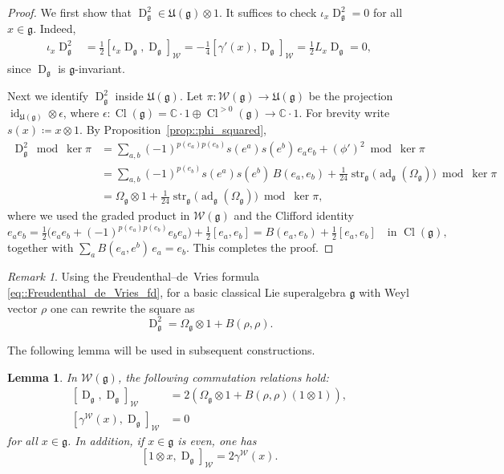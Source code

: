 \documentclass[11pt]{amsart}
\newcommand{\str}{\operatorname{str}}
\newcommand{\id}{\operatorname{id}}
\newcommand{\ad}{\operatorname{ad}}
\newcommand{\Dirac}{\operatorname{D}}
\def\WW{{\mathcal{W}}}
\def\CC{{\mathbb C}}
\def\Cl{{\operatorname{Cl}}}
\def\gg{{\mathfrak{g}}}
\def\UE{{\mathfrak U}}
\theoremstyle{plain}
\newtheorem{lemma}[theorem]{Lemma}
\theoremstyle{remark}
\theoremstyle{definition}
\numberwithin{equation}{section}
\theoremstyle{remark}
\newtheorem{remark}[theorem]{Remark}
\begin{document}
\begin{proof}
We first show that $\Dirac_{\gg}^{2}\in\UE(\gg)\otimes 1$. It suffices to check $\iota_{x}\Dirac_{\gg}^{2}=0$ for all
$x\in\gg$. Indeed,
\[
\begin{split}
\iota_{x}\Dirac_{\gg}^{2}
&=\tfrac12[\iota_{x}\Dirac_{\gg},\Dirac_{\gg}]_{\WW}
=-\tfrac14[\gamma'(x),\Dirac_{\gg}]_{\WW}
=\tfrac12 L_{x}\Dirac_{\gg}=0,
\end{split}
\]
since $\Dirac_{\gg}$ is $\gg$-invariant.

Next we identify $\Dirac_{\gg}^{2}$ inside $\UE(\gg)$. Let $\pi:\WW(\gg)\to\UE(\gg)$ be the projection
$\id_{\UE(\gg)}\otimes\epsilon$, where $\epsilon:\Cl(\gg)=\CC\cdot 1\oplus\Cl^{>0}(\gg)\to\CC\cdot 1$. For brevity write
$s(x)\coloneqq x\otimes 1$. By Proposition~\ref{prop::phi_squared},
\[
\begin{split}
\Dirac_{\gg}^{2}\bmod\ker\pi
&=\sum_{a,b}(-1)^{p(e_{a})p(e_{b})}s(e^{a})s(e^{b})\,e_{a}e_{b}+(\phi')^{2}\bmod\ker\pi\\
&=\sum_{a,b}(-1)^{p(e_{b})}s(e^{a})s(e^{b})\,B(e_{a},e_{b})
+\tfrac{1}{24}\str_{\gg}\!\bigl(\ad_{\gg}(\Omega_{\gg})\bigr)\bmod\ker\pi\\
&=\Omega_{\gg}\otimes 1+\tfrac{1}{24}\str_{\gg}\!\bigl(\ad_{\gg}(\Omega_{\gg})\bigr)\bmod\ker\pi,
\end{split}
\]
where we used the graded product in $\WW(\gg)$ and the Clifford identity
\[
e_{a}e_{b}
=\tfrac12\bigl(e_{a}e_{b}+(-1)^{p(e_{a})p(e_{b})}e_{b}e_{a}\bigr)+\tfrac12[e_{a},e_{b}]
=B(e_{a},e_{b})+\tfrac12[e_{a},e_{b}]
\quad\text{in }\Cl(\gg),
\]
together with $\sum_{a}B(e_{a},e^{b})\,e_{a}=e_{b}$. This completes the proof.
\end{proof}

\begin{remark}
Using the Freudenthal--de~Vries formula \eqref{eq::Freudenthal_de_Vries_fd}, for a basic classical Lie superalgebra $\gg$ with Weyl vector $\rho$ one can rewrite the square as
\[
\Dirac_{\gg}^{2}=\Omega_{\gg}\otimes 1+B(\rho,\rho).
\]
\end{remark}


The following lemma will be used in subsequent constructions.

\begin{lemma} \label{lemm::commutation_relations_quantum_Weil_algebra}
In $\mathcal{W}(\gg)$, the following commutation relations hold:
\[
\begin{aligned}
[\Dirac_{\gg},\Dirac_{\gg}]_{\WW}&=2(\Omega_{\gg}\otimes1+B(\rho,\rho)(1\otimes1)),\\
[\gamma^{\mathcal{W}}(x),\Dirac_{\gg}]_{\WW}&=0
\end{aligned}
\]
for all $x \in \gg$. In addition, if $x \in \gg$ is even, one has 
\[
[1\otimes x,\Dirac_{\gg}]_{\WW}=2\gamma^{\mathcal{W}}(x).
\]
\end{lemma}
\end{document}
